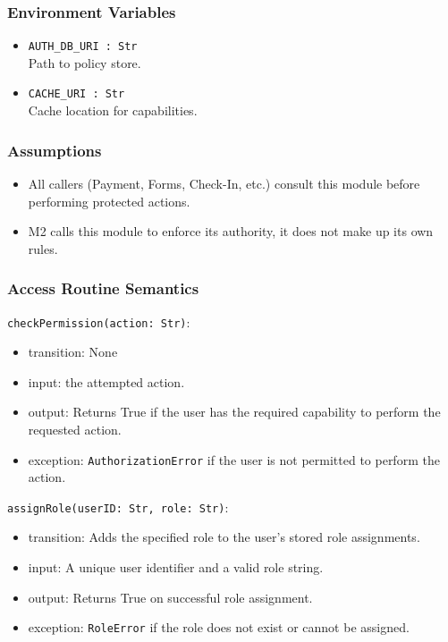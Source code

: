 \documentclass[12pt, titlepage]{article}
\begin{document}
\subsubsection{Environment Variables}

\begin{itemize}
    \item \texttt{AUTH\_DB\_URI : Str}\\
    Path to policy store.
    \item \texttt{CACHE\_URI : Str}\\
    Cache location for capabilities.
\end{itemize}

\subsubsection{Assumptions}

\begin{itemize}
    \item All callers (Payment, Forms, Check-In, etc.) consult this module before performing protected actions.
    \item M2 calls this module to enforce its authority, it does not make up its own rules.
\end{itemize}

\subsubsection{Access Routine Semantics}

\noindent \texttt{checkPermission(action: Str)}:
\begin{itemize}
\item transition: None
\item input: the attempted action.
\item output: Returns True if the user has the required capability to perform the requested action.
\item exception: \texttt{AuthorizationError} if the user is not permitted to perform the action.
\end{itemize}

\noindent \texttt{assignRole(userID: Str, role: Str)}:
\begin{itemize}
\item transition: Adds the specified role to the user's stored role assignments. 
\item input: A unique user identifier and a valid role string.
\item output: Returns True on successful role assignment.
\item exception: \texttt{RoleError} if the role does not exist or cannot be assigned.
\end{itemize}
\end{document}

